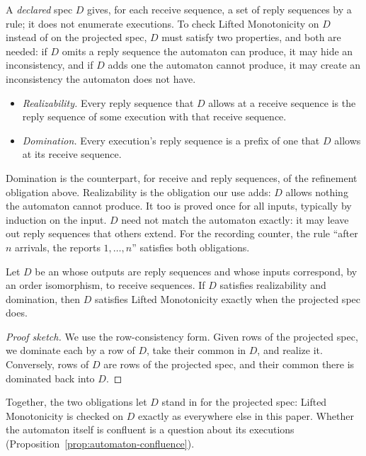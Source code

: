 A \emph{declared} spec $D$ gives, for each receive sequence, a set of reply
sequences by a rule; it does not enumerate executions.  To check Lifted
Monotonicity on $D$ instead of on the projected spec, $D$ must satisfy two
properties, and both are needed: if $D$ omits a reply sequence the automaton
can produce, it may hide an inconsistency, and if $D$ adds one the automaton cannot produce, it may create an inconsistency the automaton does not have.
\begin{itemize}
  \item \emph{Realizability.}  Every reply sequence that $D$ allows at a
        receive sequence is the reply sequence of some execution with that
        receive sequence.
  \item \emph{Domination.}  Every execution's reply sequence is a prefix of
        one that $D$ allows at its receive sequence.
\end{itemize}
Domination is the counterpart, for receive and reply sequences, of the
refinement obligation above.  Realizability is the obligation our use adds:
$D$ allows nothing the automaton cannot produce.  It too is proved once for all
inputs, typically by induction on the input.  $D$ need not match the automaton
exactly: it may leave out reply sequences that others extend.  For the
recording counter, the rule ``after $n$ arrivals, the reports $1,\ldots,n$''
satisfies both obligations.

\begin{proposition}
\label{prop:declared-specification}
Let $D$ be an \spectype whose outputs are reply sequences and whose inputs
correspond, by an order isomorphism, to receive sequences.  If $D$ satisfies
realizability and domination, then $D$ satisfies Lifted Monotonicity exactly
when the projected spec does.
\end{proposition}

\begin{proof}[Proof sketch]
We use the row-consistency form.  Given rows of the projected spec, we
dominate each by a row of $D$, take their common \outnoun in $D$, and realize
it.  Conversely, rows of $D$ are rows of the projected spec, and their common
\outnoun there is dominated back into $D$.
\end{proof}

Together, the two obligations let $D$ stand in for the projected spec:
Lifted Monotonicity is checked on $D$ exactly as everywhere else in this paper.
Whether the automaton itself is confluent is a question about its executions
(Proposition~\ref{prop:automaton-confluence}).
